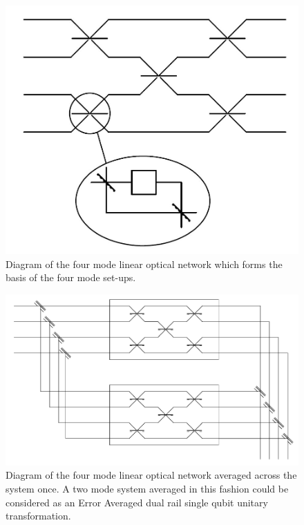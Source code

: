 \documentclass[aps,pra,twocolumn,superscriptaddress,numerical,floatfix]{revtex4-1}
\begin{document}
\begin{figure}[h]
\centerline{\includegraphics[width=\columnwidth]{4_mode_N=2.jpg}}
\caption{Diagram of the four mode linear optical network which forms the basis of the four mode set-ups. \label{fig:4 mode basis diagram}}
\end{figure}

\begin{figure}[h]
\centerline{\includegraphics[width=\columnwidth]{4_mode_average_across.jpg}}
\caption{Diagram of the four mode linear optical network averaged across the system once. A two mode system averaged in this fashion could be considered as an Error Averaged dual rail single qubit unitary transformation. \label{fig: averaging 4 mode diagram}}
\end{figure}
\end{document}
